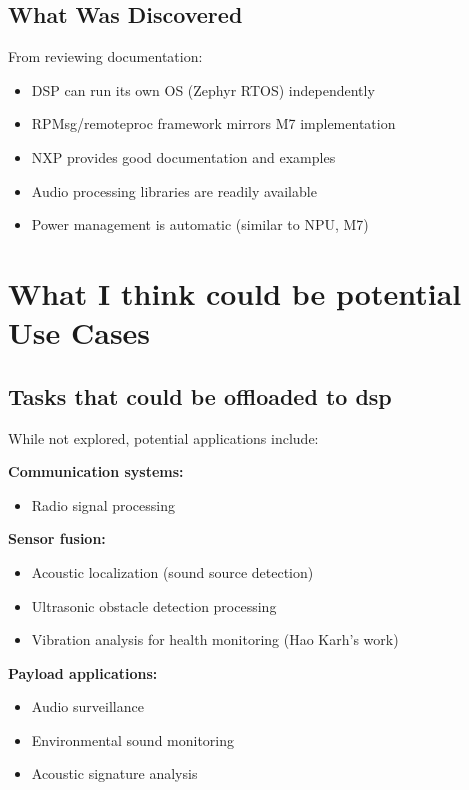 \documentclass[12pt,a4paper]{report}
\begin{document}
\subsection{What Was Discovered}

From reviewing documentation:
\begin{itemize}
    \item DSP can run its own OS (Zephyr RTOS) independently
    \item RPMsg/remoteproc framework mirrors M7 implementation
    \item NXP provides good documentation and examples
    \item Audio processing libraries are readily available
    \item Power management is automatic (similar to NPU, M7)
\end{itemize}

\section{What I think could be potential Use Cases}

\subsection{Tasks that could be offloaded to dsp}

While not explored, potential applications include:

\textbf{Communication systems:}
\begin{itemize}
    \item Radio signal processing
\end{itemize}

\textbf{Sensor fusion:}
\begin{itemize}
    \item Acoustic localization (sound source detection)
    \item Ultrasonic obstacle detection processing
    \item Vibration analysis for health monitoring (Hao Karh's work)
\end{itemize}

\textbf{Payload applications:}
\begin{itemize}
    \item Audio surveillance
    \item Environmental sound monitoring
    \item Acoustic signature analysis
\end{itemize}
\end{document}
